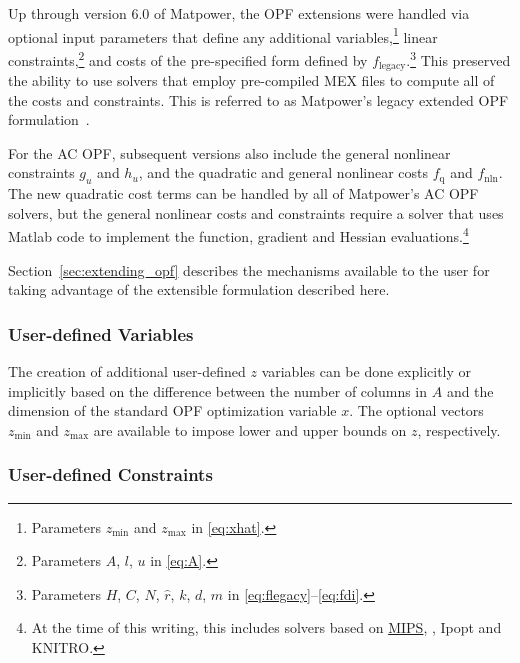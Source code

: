 \documentclass[12pt]{article}
\newcommand{\matlab}[0]{{\sc Matlab}}
\newcommand{\matpower}[0]{{\sc Matpower}}
\newcommand{\mips}[0]{{MIPS}}
\newcommand{\mipsurl}[0]{https://github.com/MATPOWER/mips}
\newcommand{\mipslink}[0]{\href{\mipsurl}{\mips{}}}
\newcommand{\ipopt}[0]{{\sc Ipopt}}
\newcommand{\knitro}[0]{{KNITRO}}
\newcommand{\code}[1]{{\relsize{-0.5}{\tt{{#1}}}}}  %
\numberwithin{equation}{section}
\numberwithin{table}{section}
\numberwithin{figure}{section}
\begin{document}
Up through version 6.0 of \matpower{}, the OPF extensions were handled via optional input parameters that define any additional variables,\footnote{Parameters $z_\mathrm{min}$ and $z_\mathrm{max}$ in \eqref{eq:xhat}.} linear constraints,\footnote{Parameters $A$, $l$, $u$ in \eqref{eq:A}.} and costs of the pre-specified form defined by $f_\mathrm{legacy}$.\footnote{Parameters $H$, $C$, $N$, $\hat{r}$, $k$, $d$, $m$ in \eqref{eq:flegacy}--\eqref{eq:fdi}.} This preserved the ability to use solvers that employ pre-compiled MEX files to compute all of the costs and constraints. This is referred to as \matpower{}'s legacy extended OPF formulation~\cite{zimmerman2009}.

For the AC OPF, subsequent versions also include the general nonlinear constraints $g_u$ and $h_u$, and the quadratic and general nonlinear costs $f_\mathrm{q}$ and $f_\mathrm{nln}$. The new quadratic cost terms can be handled by all of \matpower{}'s AC OPF solvers, but the general nonlinear costs and constraints require a solver that uses \matlab{} code to implement the function, gradient and Hessian evaluations.\footnote{At the time of this writing, this includes solvers based on \mipslink{}, \code{fmincon}, \ipopt{} and \knitro{}.} 

Section~\ref{sec:extending_opf} describes the mechanisms available to the user for taking advantage of the extensible formulation described here.

\subsubsection{User-defined Variables}

The creation of additional user-defined $z$ variables can be done explicitly or implicitly based on the difference between the number of columns in $A$ and the dimension of the standard OPF optimization variable $x$. The optional vectors $z_\mathrm{min}$ and $z_\mathrm{max}$ are available to impose lower and upper bounds on $z$, respectively.

\subsubsection{User-defined Constraints}
\end{document}
